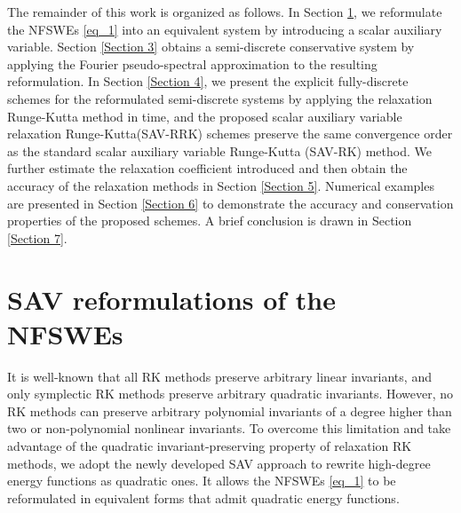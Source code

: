 \documentclass[preprint,compress,3p,10pt,fleqn]{elsarticle}
\numberwithin{equation}{section}
\begin{document}
The remainder of this work is organized as follows. In Section \ref{Section 2}, we reformulate
the NFSWEs \eqref{eq_1} into an equivalent system by introducing a scalar auxiliary variable. Section
\ref{Section 3} obtains a semi-discrete conservative system by applying the Fourier pseudo-spectral
approximation to the resulting reformulation. In Section \ref{Section 4}, we present the explicit
fully-discrete schemes for the reformulated semi-discrete systems by applying the relaxation
Runge-Kutta method in time, and the proposed scalar auxiliary variable relaxation Runge-Kutta(SAV-RRK) schemes preserve the same convergence order
as the standard scalar auxiliary variable Runge-Kutta (SAV-RK) method. We further estimate the
relaxation coefficient introduced and then obtain the accuracy of the relaxation methods in
Section \ref{Section 5}. Numerical examples are presented in Section \ref{Section 6} to demonstrate
the accuracy and conservation properties of the proposed schemes. A  brief conclusion is drawn in
Section \ref{Section 7}.
	
\section{SAV reformulations of the NFSWEs}\label{Section 2}
	
It is well-known that all RK methods preserve arbitrary linear invariants, and only symplectic RK methods preserve arbitrary quadratic invariants. However, no RK methods can preserve arbitrary polynomial invariants of a degree higher than two or non-polynomial nonlinear invariants. To overcome this limitation and take advantage of the quadratic invariant-preserving property of relaxation RK methods, we adopt the newly developed SAV approach to rewrite high-degree energy functions as quadratic ones.
It allows the NFSWEs \eqref{eq_1} to be reformulated in equivalent forms that admit quadratic energy functions.
	
\end{document}
